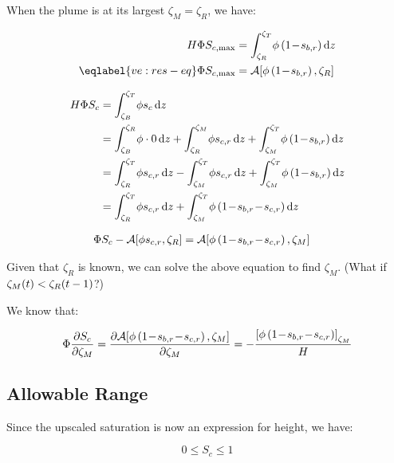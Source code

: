 \documentclass[12pt]{scrartcl}
\newcommand{\aleft}{\mathopen{}\mathclose\bgroup\left}  %
\newcommand{\aright}{\aftergroup\egroup\right}          %
\newcommand{\binop}[3]{#1\mkern1mu{#2}\mkern1mu #3}     %
\newcommand{\dual}[1]{\binop{1}{-}{#1}}                 %
\newcommand{\ddual}[2]{\binop{\binop{1}{-}{#1}}{-}{#2}} %
\newcommand{\at}[2]{\left[ #1 \right]_{#2}}             %
\newcommand{\der}[2]{\frac{\partial{#1}}{\partial{#2}}}       %
\newcommand{\intg}[4]{\int_{#1}^{#2}\!{#3}\,\mathrm{d}{#4}}   %
\newcommand{\Hei}{H}        %
\newcommand{\Por}{\Phi}     %
\newcommand{\por}{\phi}     %
\newcommand{\Sat}{S}        %
\newcommand{\sat}{s}        %
\newcommand{\sr}[1]{\sat_{#1,r}}    %
\newcommand{\tim}{t}        %
\newcommand{\Lev}{\zeta}    %
\newcommand{\Top}{T}        %
\newcommand{\Bot}{B}        %
\newcommand{\Res}{R}        %
\newcommand{\Mob}{M}        %
\newcommand{\dph}{z}        %
\newcommand{\nap}{c}        %
\newcommand{\wet}{b}        %
\newcommand{\avg}[2]{\mathcal{A}\aleft[#1, #2\aright]}  %
\newcommand{\Satn}{\Sat_\nap}
\newcommand{\satn}{\sat_\nap}
\newcommand{\Satnmax}{\Sat_{\nap,\max}} %
\newcommand{\snr}{\sr{\nap}}    %
\newcommand{\swr}{\sr{\wet}}    %
\newcommand{\LevT}{\Lev_\Top}
\newcommand{\LevB}{\Lev_\Bot}
\newcommand{\LevM}{\Lev_\Mob}
\newcommand{\LevR}{\Lev_\Res}
\begin{document}
When the plume is at its largest \( \LevM = \LevR \), we have:

\begin{align}
\Hei \Por \Satnmax &= \intg{ \LevR }{ \LevT }{ \por \left( \dual{ \swr } \right) }{ \dph } \\
\eqlabel{ve:res-eq}
\Por \Satnmax &= \avg{ \por \left( \dual{ \swr } \right) }{ \LevR }
\end{align}

\begin{align}
\Hei \Por \Satn &= \intg{ \LevB }{ \LevT }{ \por \satn }{ \dph } \\
&= \intg{ \LevB }{ \LevR }{ \por \cdot 0 }{ \dph } + \intg{ \LevR }{ \LevM }{ \por \snr }{ \dph } + \intg{ \LevM }{ \LevT }{ \por \left( \dual{ \swr } \right) }{ \dph } \\
&= \intg{ \LevR }{ \LevT }{ \por \snr }{ \dph } - \intg{ \LevM }{ \LevT }{ \por \snr }{ \dph } + \intg{ \LevM }{ \LevT }{ \por \left( \dual{ \swr } \right) }{ \dph } \\
&= \intg{ \LevR }{ \LevT }{ \por \snr }{ \dph } + \intg{ \LevM }{ \LevT }{ \por \left( \ddual{ \swr }{ \snr } \right) }{ \dph }
\end{align}

\begin{align}
\Por \Satn - \avg{ \por \snr }{ \LevR } &= \avg{ \por \left( \ddual{ \swr }{ \snr } \right) }{ \LevM }
\end{align}

Given that \( \LevR \) is known, we can solve the above equation to find \( \LevM \). (What if \( \LevM \aleft( \tim \aright) < \LevR \aleft( \tim - 1 \aright) \)?)

We know that:

\begin{equation}
\Por \der{ \Satn }{ \LevM } = \der{ \avg{ \por \left( \ddual{ \swr }{ \snr } \right) }{ \LevM } }{ \LevM } = - \frac{ \at{ \por \left( \ddual{ \swr }{ \snr } \right) }{ \LevM } }{ \Hei }
\end{equation}

\subsection{Allowable Range}

Since the upscaled saturation is now an expression for height, we have:

\begin{equation}
0 \leq \Satn \leq 1
\end{equation}
\end{document}
